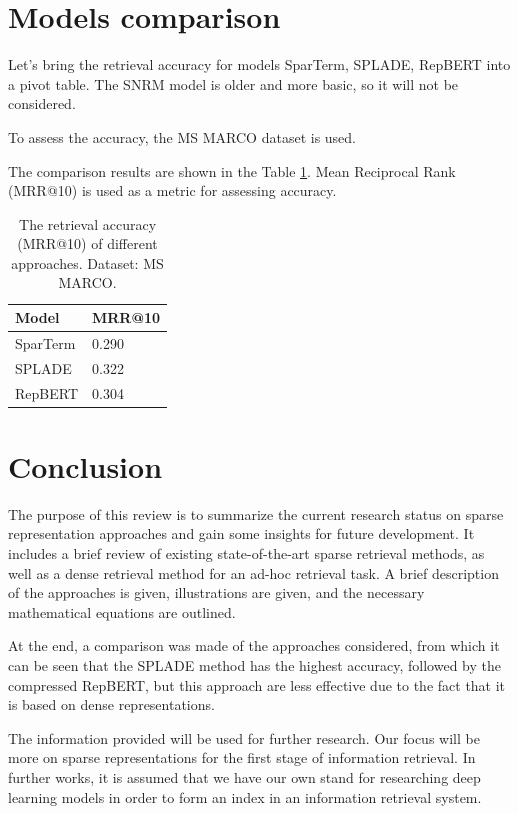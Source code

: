 \documentclass[
    twocolumn,
]{ceurart}
\begin{document}
    \section{Models comparison}

    Let's bring the retrieval accuracy for models SparTerm, SPLADE, RepBERT into a pivot table.
    The SNRM model is older and more basic, so it will not be considered.

    To assess the accuracy, the MS MARCO dataset\cite{MS-MARCO} is used.

    The comparison results are shown in the Table \ref{tab:evaluation}.
    Mean Reciprocal Rank (MRR@10) is used as a metric for assessing accuracy.

    \begin{table}[h]
        \caption{The retrieval accuracy (MRR@10) of different approaches. Dataset: MS MARCO.}
        \label{tab:evaluation}
        \begin{tabular}{p{}|p{}}
            \toprule
            Model                   & MRR@10 \\
            \midrule
            SparTerm\cite{SparTerm} & 0.290  \\
            SPLADE\cite{SPLADE}     & 0.322  \\
            RepBERT\cite{RepBERT}   & 0.304  \\
            \bottomrule
        \end{tabular}
    \end{table}


    \section{Conclusion}

    The purpose of this review is to summarize the current research status on sparse representation
    approaches and gain some insights for future development.
    It includes a brief review of existing state-of-the-art sparse retrieval methods, as well as a
    dense retrieval method for an ad-hoc retrieval task.
    A brief description of the approaches is given, illustrations are given, and the necessary
    mathematical equations are outlined.

    At the end, a comparison was made of the approaches considered, from which it can be seen that
    the SPLADE method has the highest accuracy, followed by the compressed RepBERT, but this
    approach are less effective due to the fact that it is based on dense representations.

    The information provided will be used for further research.
    Our focus will be more on sparse representations for the first stage of information retrieval.
    In further works, it is assumed that we have our own stand for researching deep learning
    models in order to form an index in an information retrieval system.

    

    \appendix
\end{document}
